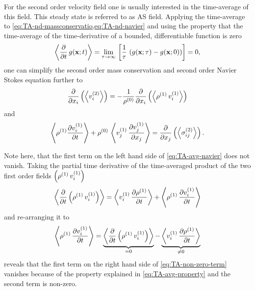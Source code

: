 For the second order velocity field one is usually interested in the 
time-average of this field. This steady state is referred to as AS field. 
Applying the time-average to \cref{eq:TA-nd-massconservatio,eq:TA-nd-navier} 
and using the property that the time-average of the time-derivative of a 
bounded, differentiable function is zero~\cite{Baasch2020}
\begin{equation}
  \left\langle \pdv{t}\,g(\vb{x};t) \right\rangle = \lim\limits_{\tau \rightarrow \infty}{\,
    \left[ \frac{1}{\tau}\,\left( g(\vb{x}; \tau) - g(\vb{x}; 0) \right) 
  \right]} = 0,
  \label{eq:TA-avg-property}
\end{equation}
one can simplify the second order mass conservation and second order Navier 
Stokes equation further to
\begin{equation}
  \pdv{x_{i}}\left( \left\langle v_{i}^{(2)} \right\rangle \right) = 
  -\frac{1}{\rho^{(0)}} \pdv{x_{i}}\left(\left\langle  
  \rho^{(1)}\,v_{i}^{(1)}  \right\rangle\right)
  \label{eq:TA-avg-massconservatio}
\end{equation}
and
\begin{equation}
  \left\langle \rho^{(1)} \pdv{  v_{i}^{(1)}  }{t} \right\rangle + 
  \rho^{(0)}\,\left\langle v_{j}^{(1)}\,\pdv{  v_{j}^{(1)}  }{x_{j}} \right\rangle 
  = \pdv{x_{j}}\left( \left\langle \sigma_{ij}^{(2)} \right\rangle \right).
  \label{eq:TA-avg-navier}
\end{equation}

Note here, that the first term on the left hand side of \cref{eq:TA-avg-navier} 
does not vanish. Taking the partial time derivative of the time-averaged 
product of the two first order fields 
$\left(\rho^{(1)}\,v_{i}^{(1)}\right)$
\begin{equation}
  \left\langle \pdv{t}\left( \rho^{(1)}\,v_{i}^{(1)} \right) \right\rangle
  =
  \left\langle v_{i}^{(1)}\,\pdv{  \rho^{(1)}  }{t} \right\rangle
  +
  \left\langle \rho^{(1)}\,\pdv{  v_{i}^{(1)}  }{t} \right\rangle
\end{equation}
and re-arranging it to
\begin{equation}
  \left\langle \rho^{(1)}\,\pdv{  v_{i}^{(1)}  }{t} \right\rangle
  =
  \underbrace{
  \left\langle \pdv{t}\left( \rho^{(1)}\,v_{i}^{(1)} \right) \right\rangle
}_{=0}
  -
  \underbrace{
  \left\langle v_{i}^{(1)}\,\pdv{  \rho^{(1)}  }{t} \right\rangle
}_{\neq 0}
  \label{eq:TA-non-zero-term}
\end{equation}
reveals that the first term on the right hand side of 
\cref{eq:TA-non-zero-term} vanishes because of the property explained in 
\cref{eq:TA-avg-property} and the second term is non-zero.


